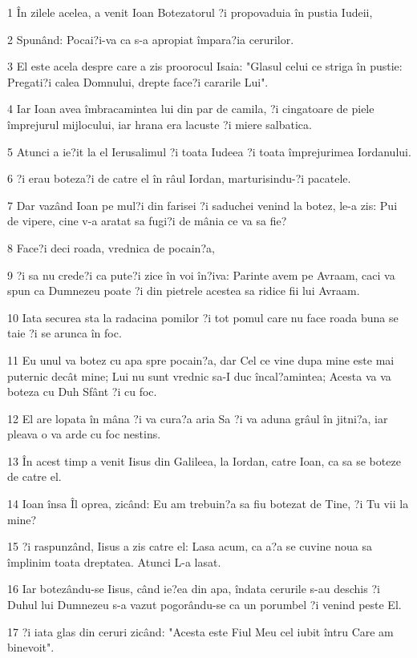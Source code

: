 \par 1 În zilele acelea, a venit Ioan Botezatorul ?i propovaduia în pustia Iudeii,
\par 2 Spunând: Pocai?i-va ca s-a apropiat împara?ia cerurilor.
\par 3 El este acela despre care a zis proorocul Isaia: "Glasul celui ce striga în pustie: Pregati?i calea Domnului, drepte face?i cararile Lui".
\par 4 Iar Ioan avea îmbracamintea lui din par de camila, ?i cingatoare de piele împrejurul mijlocului, iar hrana era lacuste ?i miere salbatica.
\par 5 Atunci a ie?it la el Ierusalimul ?i toata Iudeea ?i toata împrejurimea Iordanului.
\par 6 ?i erau boteza?i de catre el în râul Iordan, marturisindu-?i pacatele.
\par 7 Dar vazând Ioan pe mul?i din farisei ?i saduchei venind la botez, le-a zis: Pui de vipere, cine v-a aratat sa fugi?i de mânia ce va sa fie?
\par 8 Face?i deci roada, vrednica de pocain?a,
\par 9 ?i sa nu crede?i ca pute?i zice în voi în?iva: Parinte avem pe Avraam, caci va spun ca Dumnezeu poate ?i din pietrele acestea sa ridice fii lui Avraam.
\par 10 Iata securea sta la radacina pomilor ?i tot pomul care nu face roada buna se taie ?i se arunca în foc.
\par 11 Eu unul va botez cu apa spre pocain?a, dar Cel ce vine dupa mine este mai puternic decât mine; Lui nu sunt vrednic sa-I duc încal?amintea; Acesta va va boteza cu Duh Sfânt ?i cu foc.
\par 12 El are lopata în mâna ?i va cura?a aria Sa ?i va aduna grâul în jitni?a, iar pleava o va arde cu foc nestins.
\par 13 În acest timp a venit Iisus din Galileea, la Iordan, catre Ioan, ca sa se boteze de catre el.
\par 14 Ioan însa Îl oprea, zicând: Eu am trebuin?a sa fiu botezat de Tine, ?i Tu vii la mine?
\par 15 ?i raspunzând, Iisus a zis catre el: Lasa acum, ca a?a se cuvine noua sa împlinim toata dreptatea. Atunci L-a lasat.
\par 16 Iar botezându-se Iisus, când ie?ea din apa, îndata cerurile s-au deschis ?i Duhul lui Dumnezeu s-a vazut pogorându-se ca un porumbel ?i venind peste El.
\par 17 ?i iata glas din ceruri zicând: "Acesta este Fiul Meu cel iubit întru Care am binevoit".

